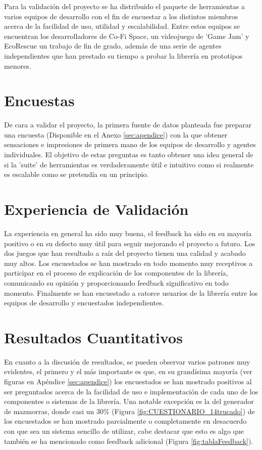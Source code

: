 Para la validación del proyecto se ha distribuido el paquete de herramientas a varios equipos de desarrollo con el fin de encuestar a los distintos miembros acerca de la facilidad de uso, utilidad y escalabilidad.
 Entre estos equipos se encuentran los desarrolladores de Co-Fi Space\cite{CoFiSpace}, un videojuego de 'Game Jam' y EcoRescue\cite{EcoRescue} un trabajo de fin de grado, además de una serie de agentes 
 independientes que han prestado su tiempo a probar la librería en prototipos menores.

\section{Encuestas}

De cara a validar el proyecto, la primera fuente de datos planteada fue preparar una encuesta (Disponible en el Anexo \ref{sec:apendice}) con la que obtener sensaciones e impresiones de primera mano de los equipos
 de desarrollo y agentes individuales. El objetivo de estas preguntas es tanto obtener una idea general de si la 'suite' de herramientas es verdaderamente útil e intuitivo como si realmente es escalable como
 se pretendía en un principio.

\section{Experiencia de Validación}
La experiencia en general ha sido muy buena, el feedback ha sido en su mayoría positivo o en su defecto muy útil para seguir mejorando el proyecto a futuro. Los dos juegos que han resultado a raíz del proyecto 
tienen una calidad y acabado muy altos. Los encuestados se han mostrado en todo momento muy receptivos a participar en el proceso de explicación de los componentes de la librería, comunicando su opinión y 
proporcionando feedback significativo en todo momento. Finalmente se han encuestado a catorce usuarios de la librería entre los equipos de desarrollo y encuestados independientes.

\section{Resultados Cuantitativos}
En cuanto a la discusión de resultados, se pueden observar varios patrones muy evidentes, el primero y el más importante es que, en su grandísima mayoría (ver figuras en Apéndice \ref{sec:apendice}) los encuestados
se han mostrado positivos al ser preguntados acerca de la facilidad de uso e implementación de cada uno de los componentes o sistemas de la librería. Una notable excepción es la del generador de mazmorras, donde
 casi un 30\% (Figura \ref{fig:CUESTIONARIO_14trucado}) de los encuestados se han mostrado parcialmente o completamente en desacuerdo con que sea un sistema sencillo de utilizar, cabe destacar que esto es algo que 
 también se ha mencionado como feedback adicional (Figura \ref{fig:tablaFeedback}).

